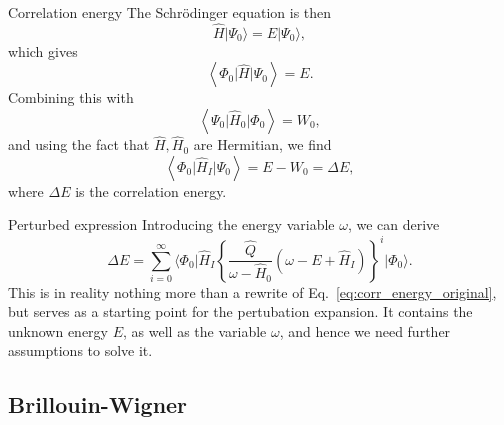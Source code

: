 \documentclass[UKenglish,aspectratio=169]{beamer}
\begin{document}
\begin{frame}{Correlation energy}
    The Schrödinger equation is then
    \begin{equation}
        \hat{H} \lvert \Psi_0 \rangle = E \lvert \Psi_0 \rangle,
    \end{equation}
    which gives
    \begin{equation}
        \left\langle \Phi_0 \vert \hat{H} \vert \Psi_0 \right\rangle = E.
    \end{equation}
    Combining this with
    \begin{equation}
        \left\langle \Psi_0 \vert \hat{H}_0 \vert \Phi_0 \right\rangle = W_0,
    \end{equation}
    and using the fact that $\hat{H}, \hat{H}_0$ are Hermitian, we find
    \begin{equation}\label{eq:corr_energy_original}
        \left\langle \Phi_0 \vert \hat{H}_I \vert \Psi_0 \right\rangle
        = E - W_0
        = \Delta E,
    \end{equation}
    where $\Delta E$ is the correlation energy.
\end{frame}

\begin{frame}{Perturbed expression}
    Introducing the energy variable $\omega$, we can derive
    \begin{equation}\label{eq:corr_energy}
        \Delta E = \sum_{i = 0}^\infty \Big\langle \Phi_0 \big\vert \hat{H}_I \left\{
            \frac{\hat{Q}}{\omega - \hat{H}_0} \left( \omega - E + \hat{H}_I \right)
        \right\}^{i} \big\lvert \Phi_0 \Big\rangle.
    \end{equation}
    This is in reality nothing more than a rewrite of Eq.~\eqref{eq:corr_energy_original}, but serves as a starting point for the pertubation expansion.
    It contains the unknown energy $E$, as well as the variable $\omega$, and hence we need further assumptions to solve it.
\end{frame}

\subsection{Brillouin-Wigner}
\end{document}
